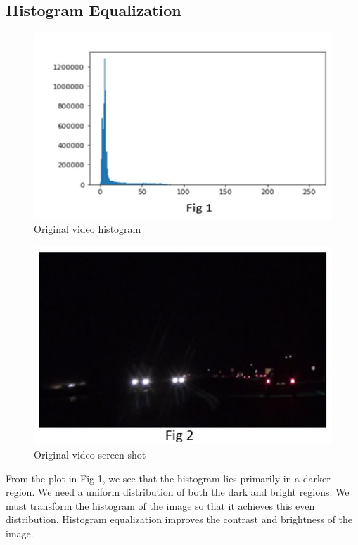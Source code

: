 \documentclass[12pt]{report}
\begin{document}
{\subsection*{Histogram Equalization}
\begin{figure}[h!]
    \centering
    \includegraphics[scale=0.4]{Capture1.JPG}
    \caption{Original video histogram}
    \label{fig:my_label2}
\end{figure}
\begin{figure}[h!]
    \centering
    \includegraphics[scale=0.4]{Capture2.JPG}
    \caption{Original video screen shot}
    \label{fig:my_label2}
\end{figure}


From the plot in Fig 1, we see that the histogram lies primarily in a darker region.  We need a uniform distribution of both the dark and bright regions. We must transform the histogram of the image so that it achieves this even distribution.  Histogram equalization improves the contrast and brightness of the image. \newline

}
\end{document}
